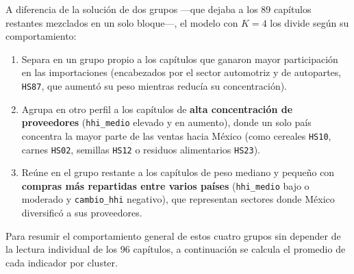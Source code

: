 \documentclass[
]{article}
\begin{document}
A diferencia de la solución de dos grupos ---que dejaba a los 89
capítulos restantes mezclados en un solo bloque---, el modelo con
\(K=4\) los divide según su comportamiento:

\begin{enumerate}
\def\labelenumi{\arabic{enumi}.}
\item
  Separa en un grupo propio a los capítulos que ganaron mayor
  participación en las importaciones (encabezados por el sector
  automotriz y de autopartes, \texttt{HS87}, que aumentó su peso
  mientras reducía su concentración).
\item
  Agrupa en otro perfil a los capítulos de \textbf{alta concentración de
  proveedores} (\texttt{hhi\_medio} elevado y en aumento), donde un solo
  país concentra la mayor parte de las ventas hacia México (como
  cereales \texttt{HS10}, carnes \texttt{HS02}, semillas \texttt{HS12} o
  residuos alimentarios \texttt{HS23}).
\item
  Reúne en el grupo restante a los capítulos de peso mediano y pequeño
  con \textbf{compras más repartidas entre varios países}
  (\texttt{hhi\_medio} bajo o moderado y \texttt{cambio\_hhi} negativo),
  que representan sectores donde México diversificó a sus proveedores.
\end{enumerate}

Para resumir el comportamiento general de estos cuatro grupos sin
depender de la lectura individual de los 96 capítulos, a continuación se
calcula el promedio de cada indicador por cluster.
\end{document}

